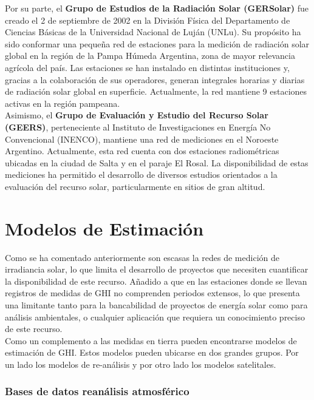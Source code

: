 Por su parte, el \textbf{Grupo de Estudios de la Radiación Solar (GERSolar)} fue creado el 2 de septiembre de 2002 en la División Física del Departamento de Ciencias Básicas de la Universidad Nacional de Luján (UNLu). Su propósito ha sido conformar una pequeña red de estaciones para la medición de radiación solar global en la región de la Pampa Húmeda Argentina, zona de mayor relevancia agrícola del país. Las estaciones se han instalado en distintas instituciones y, gracias a la colaboración de sus operadores, generan integrales horarias y diarias de radiación solar global en superficie. Actualmente, la red mantiene 9 estaciones activas en la región pampeana.\\

Asimismo, el \textbf{Grupo de Evaluación y Estudio del Recurso Solar (GEERS)}, perteneciente al Instituto de Investigaciones en Energía No Convencional (INENCO), mantiene una red de mediciones en el Noroeste Argentino. Actualmente, esta red cuenta con dos estaciones radiométricas ubicadas en la ciudad de Salta y en el paraje El Rosal. La disponibilidad de estas mediciones ha permitido el desarrollo de diversos estudios orientados a la evaluación del recurso solar, particularmente en sitios de gran altitud.



\section{Modelos de Estimación} \label{ModelosDeEstimación}

Como se ha comentado anteriormente son escasas la redes de medición de irradiancia solar, lo que limita el desarrollo de proyectos que necesiten cuantificar la disponibilidad de este recurso. Añadido a que en las estaciones donde se llevan registros de medidas de GHI no comprenden periodos extensos, lo que presenta una limitante tanto para la bancabilidad de proyectos de energía solar como para análisis ambientales, o cualquier aplicación que requiera un conocimiento preciso de este recurso.\\

Como un complemento a las medidas en tierra pueden encontrarse modelos de estimación de GHI. Estos modelos pueden ubicarse en dos grandes grupos. Por un lado los modelos de re-análisis y por otro lado los modelos satelitales.


\subsubsection{Bases de datos reanálisis atmosférico}

